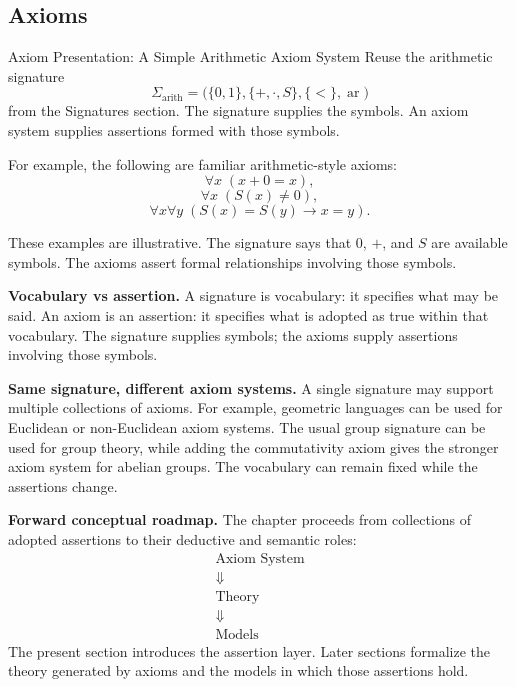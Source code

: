 \subsection*{Axioms}
\label{sec:axiom-systems-axioms}

\begin{axiombox}{Axiom Presentation: A Simple Arithmetic Axiom System}
Reuse the arithmetic signature
\[
  \Sigma_{\mathrm{arith}}
  =
  \bigl(
    \{0,1\},
    \{+,\cdot,S\},
    \{<\},
    \operatorname{ar}
  \bigr)
\]
from the Signatures section. The signature supplies the symbols. An axiom
system supplies assertions formed with those symbols.

For example, the following are familiar arithmetic-style axioms:
\[
  \forall x\;(x+0=x),
\]
\[
  \forall x\;(S(x)\neq 0),
\]
\[
  \forall x\forall y\;
  (S(x)=S(y)\rightarrow x=y).
\]

These examples are illustrative. The signature says that $0$, $+$, and $S$
are available symbols. The axioms assert formal relationships involving those
symbols.
\end{axiombox}

\begin{remark*}
\textbf{Vocabulary vs assertion.}
A signature is vocabulary: it specifies what may be said. An axiom is an
assertion: it specifies what is adopted as true within that vocabulary. The
signature supplies symbols; the axioms supply assertions involving those
symbols.

\textbf{Same signature, different axiom systems.}
A single signature may support multiple collections of axioms. For example,
geometric languages can be used for Euclidean or non-Euclidean axiom systems.
The usual group signature can be used for group theory, while adding the
commutativity axiom gives the stronger axiom system for abelian groups. The
vocabulary can remain fixed while the assertions change.

\textbf{Forward conceptual roadmap.}
The chapter proceeds from collections of adopted assertions to their deductive
and semantic roles:
\[
\begin{array}{c}
\text{Axiom System}\\
\Downarrow\\
\text{Theory}\\
\Downarrow\\
\text{Models}
\end{array}
\]
The present section introduces the assertion layer. Later sections formalize
the theory generated by axioms and the models in which those assertions hold.
\end{remark*}


